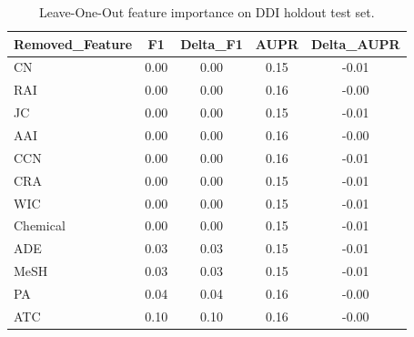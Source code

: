 \begin{table}[htbp]
\centering
\caption{Leave-One-Out feature importance on DDI holdout test set.}
\label{tab:ablation_loo}
\begin{tabular}{lcccc}
\toprule
Removed\_Feature & F1 & Delta\_F1 & AUPR & Delta\_AUPR \\
\midrule
CN & 0.00 & 0.00 & 0.15 & -0.01 \\
RAI & 0.00 & 0.00 & 0.16 & -0.00 \\
JC & 0.00 & 0.00 & 0.15 & -0.01 \\
AAI & 0.00 & 0.00 & 0.16 & -0.00 \\
CCN & 0.00 & 0.00 & 0.16 & -0.01 \\
CRA & 0.00 & 0.00 & 0.15 & -0.01 \\
WIC & 0.00 & 0.00 & 0.15 & -0.01 \\
Chemical & 0.00 & 0.00 & 0.15 & -0.01 \\
ADE & 0.03 & 0.03 & 0.15 & -0.01 \\
MeSH & 0.03 & 0.03 & 0.15 & -0.01 \\
PA & 0.04 & 0.04 & 0.16 & -0.00 \\
ATC & 0.10 & 0.10 & 0.16 & -0.00 \\
\bottomrule
\end{tabular}
\end{table}